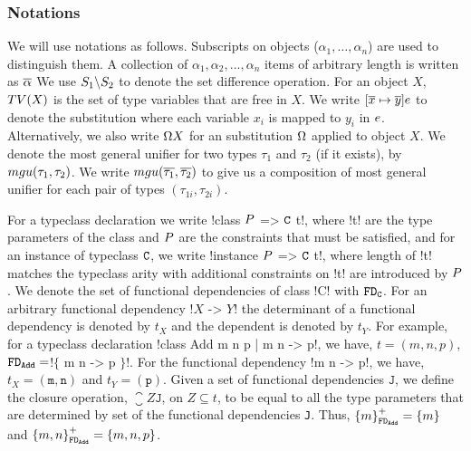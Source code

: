 \documentclass[format=acmsmall,manuscript,review,screen,nonacm,margin=1in,11pt]{acmart}
\begin{document}
\subsubsection {Notations}\label{subsubsec:tcfd-notations}
We will use notations as follows. Subscripts on objects
($\alpha_1,\ldots, \alpha_n$) are used to distinguish them.
A collection of $\alpha_1, \alpha_2, ..., \alpha_n$ items of arbitrary length is written as $\overline{\alpha}$
We use $S_1 \backslash S_2$ to denote the set difference operation. For an object $X$,
$TV(X)$ is the set of type variables that are free in $X$.
We write $[\overline{x}\mapsto\overline{y}]e$ to denote the substitution where each variable
$x_i$ is mapped to $y_i$ in $e$. Alternatively, we also
write $\Omega X$ for an substitution $\Omega$ applied to object $X$.
We denote the most general unifier for two types $\tau_1$ and $\tau_2$ (if it exists),
by $mgu(\tau_1,\tau_2)$\cite{robinson_machine-oriented_1965}.
We write $mgu(\overline{\tau_1},\overline{\tau_2})$ to give us a composition of most general
unifier for each pair of types $(\tau_{1i}, \tau_{2i})$.

For a typeclass declaration we write !class $P$ => $\texttt{C}$ t!, where !t! are the type parameters
of the class and $P$ are the constraints that must be satisfied, and for an instance of typeclass
$\texttt{C}$, we write !instance $P$ => $\texttt{C}$ t!, where length of !t!
matches the typeclass arity with additional constraints on !t! are introduced by $P$.
We denote the set of functional dependencies of class !C! with $\texttt{FD}_\texttt{C}$.
For an arbitrary functional dependency !$X$ -> $Y$! the determinant of a functional dependency
is denoted by $t_{X}$ and the dependent is denoted by  $t_{Y}$.
For example, for a typeclass declaration !class Add m n p | m n -> p!,
we have, $t = (m, n, p)$, $\texttt{FD}_\texttt{Add}=$!$\{$ m n -> p $\}$!.
For the functional dependency !m n -> p!, we have, $t_X = {(\texttt{m},\texttt{n})}$ and $t_Y = {(\texttt{p})}$.
Given a set of functional dependencies $\texttt{J}$, we define the closure operation,
$\closure Z {\texttt{J}}$, on $Z \subseteq t$, to be equal to all the type parameters
that are determined by set of the functional dependencies \texttt{J}.
Thus, ${\{m\}}^{+}_{\texttt{FD}_\texttt{Add}} = \{m\}$ and ${\{m, n\}}^{+}_{\texttt{FD}_\texttt{Add}} = \{m, n, p\}$.
\end{document}
